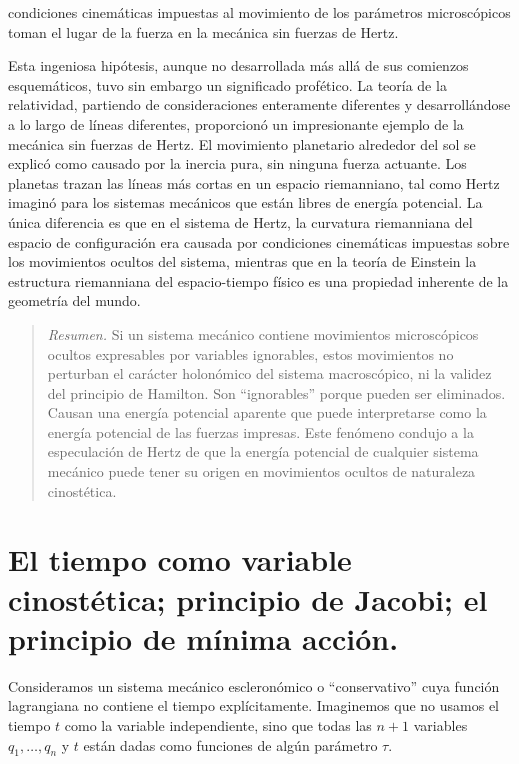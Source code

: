 \documentclass[12pt,a4paper]{book}
\begin{document}
condiciones cinemáticas impuestas al movimiento de los parámetros microscópicos toman el lugar de la fuerza en la mecánica sin fuerzas de Hertz.

Esta ingeniosa hipótesis, aunque no desarrollada más allá de sus comienzos esquemáticos, tuvo sin embargo un significado profético. La teoría de la relatividad, partiendo de consideraciones enteramente diferentes y desarrollándose a lo largo de líneas diferentes, proporcionó un impresionante ejemplo de la mecánica sin fuerzas de Hertz. El movimiento planetario alrededor del sol se explicó como causado por la inercia pura, sin ninguna fuerza actuante. Los planetas trazan las líneas más cortas en un espacio riemanniano, tal como Hertz imaginó para los sistemas mecánicos que están libres de energía potencial. La única diferencia es que en el sistema de Hertz, la curvatura riemanniana del espacio de configuración era causada por condiciones cinemáticas impuestas sobre los movimientos ocultos del sistema, mientras que en la teoría de Einstein la estructura riemanniana del espacio-tiempo físico es una propiedad inherente de la geometría del mundo.

\begin{quote}
\textit{Resumen.} Si un sistema mecánico contiene movimientos microscópicos ocultos expresables por variables ignorables, estos movimientos no perturban el carácter holonómico del sistema macroscópico, ni la validez del principio de Hamilton. Son ``ignorables'' porque pueden ser eliminados. Causan una energía potencial aparente que puede interpretarse como la energía potencial de las fuerzas impresas. Este fenómeno condujo a la especulación de Hertz de que la energía potencial de cualquier sistema mecánico puede tener su origen en movimientos ocultos de naturaleza cinostética.
\end{quote}

\section{El tiempo como variable cinostética; principio de Jacobi; el principio de mínima acción.}

Consideramos un sistema mecánico escleronómico o ``conservativo'' cuya función lagrangiana no contiene el tiempo explícitamente. Imaginemos que no usamos el tiempo $t$ como la variable independiente, sino que todas las $n + 1$ variables $q_1, \ldots, q_n$ y $t$ están dadas como funciones de algún parámetro $\tau$.

\end{document}
